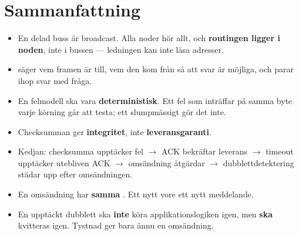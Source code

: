 \section*{Sammanfattning}

\begin{itemize}
  \item En delad buss är broadcast. Alla noder hör allt, och \textbf{routingen ligger i noden},
    inte i bussen --- ledningen kan inte läsa adresser.
  \item {} säger vem framen är till,  vem den kom från så att svar är möjliga,
    och  parar ihop svar med fråga.
  \item En felmodell ska vara \textbf{deterministisk}. Ett fel som inträffar på samma byte varje
    körning går att testa; ett slumpmässigt gör det inte.
  \item Checksumman ger \textbf{integritet}, inte \textbf{leveransgaranti}.
  \item Kedjan: checksumma upptäcker fel $\rightarrow$ ACK bekräftar leverans $\rightarrow$
    timeout upptäcker utebliven ACK $\rightarrow$ omsändning åtgärdar $\rightarrow$
    dubblettdetektering städar upp efter omsändningen.
  \item En omsändning har \textbf{samma} . Ett nytt vore ett nytt meddelande.
  \item En upptäckt dubblett ska \textbf{inte} köra applikationslogiken igen, men \textbf{ska}
    kvitteras igen. Tystnad ger bara ännu en omsändning.
\end{itemize}
